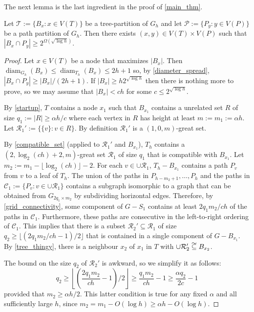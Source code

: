 \documentclass{patmorin}
\DeclareMathOperator{\diam}{diam}
\renewcommand{\le}{\leqslant}
\renewcommand{\ge}{\geqslant}
\newcommand\subsetcong{\mathrel{\text{%
    \setbox0\hbox{$\subseteq$}%
    \rlap{\hbox to \wd0{\hss\hss\hss\raisebox{1.5\height}{$\sim$}\hss}}\box0
}}}
\begin{document}
The next lemma is the last ingredient in the proof of \cref{main_thm}.
\begin{lem}\label{big_lemma}
  Let $\mathcal{T}:=\{B_x:x\in V(T)\}$ be a tree-partition of $G_h$ and let $\mathcal{P}:=\{P_y:y\in V(P)\}$ be a path partition of $G_h$.  Then there exists $(x,y)\in V(T)\times V(P)$ such that $|B_x\cap P_y| \ge 2^{\Omega(\sqrt{\log h})}$.
\end{lem}

\begin{proof}
  Let $x\in V(T)$ be a node that maximizes $|B_x|$.  Then $\diam_{G_h}(B_x)\le\diam_{T_h}(B_x) \le 2h+1$ so, by \cref{diameter_spread}, $|B_x\cap P_y|\ge |B_x|/(2h+1)$.  If $|B_x|\ge h2^{\sqrt{\log h}}$ then there is nothing more to prove, so we may assume that $|B_x| < ch$ for some $c\le 2^{\sqrt{\log h}}$.

  By \cref{startup}, $T$ contains a node $x_1$ such that $B_{x_1}$ contains a unrelated set $R$ of size $q_1:=|R|\ge \alpha h/c$ where each vertex in $R$ has height at least $m:=m_1:=\alpha h$.  Let  $\mathcal{R}_1':=\{\{v\}:v\in R\}$.  By definition $\mathcal{R}_1'$ is a $(1,0,m)$-great set.

  By \cref{compatible_set} (applied to $\mathcal{R}_1'$ and $B_{x_1}$), $T_h$ contains a $(2,\log_2(ch)+2,m)$-great set $\mathcal{R}_1$ of size $q_1$ that is compatible with $B_{x_1}$.  Let $m_2:=m_1-\lfloor\log_2(ch)\rfloor -2$.  For each $v\in\cup\mathcal{R}_1$, $T_h-B_{x_1}$ contains a path $P_v$ from $v$ to a leaf of $T_h$.  The union of the paths in $P_{h-m_2+1},\ldots,P_{h}$ and the paths in $\mathcal{C}_1:=\{P_v:v\in\cup\mathcal{R}_1\}$ contains a subgraph isomorphic to a graph that can be obtained from $G_{2q_1\times m_2}$ by subdividing horizontal edges.  Therefore, by \cref{grid_connectivity}, some component of $G-S_1$ contains at least $2q_1m_2/ch$ of the paths in $\mathcal{C}_1$.  Furthermore, these paths are consecutive in the left-to-right ordering of $\mathcal{C}_1$.  This implies that there is a subset $\mathcal{R}_2'\subseteq \mathcal{R}_1$ of size $q_2\ge \lfloor(2q_1m_2/ch-1)/2\rfloor$ that is contained in a single component of $G-B_{x_1}$. By \cref{tree_thingy}, there is a neighbour $x_2$ of $x_1$ in $T$ with $\cup\mathcal{R}_2'\subsetcong B_{x_2}$.

  The bound on the size $q_2$ of $\mathcal{R}_2'$ is awkward, so we simplify it as follows:
  \[
    q_2 \ge \left\lfloor\left(\frac{2q_1m_2}{ch} - 1\right) /2 \right\rfloor
        \ge \frac{q_1m_2}{ch} - 1 \ge \frac{\alpha q_2}{2c} - 1
  \]
  provided that $m_2 \ge\alpha h/2$.  This latter condition is true for any fixed $\alpha$ and all sufficiently large $h$, since $m_2 = m_1 - O(\log h) \ge \alpha h - O(\log h)$.


\end{proof}
\end{document}
